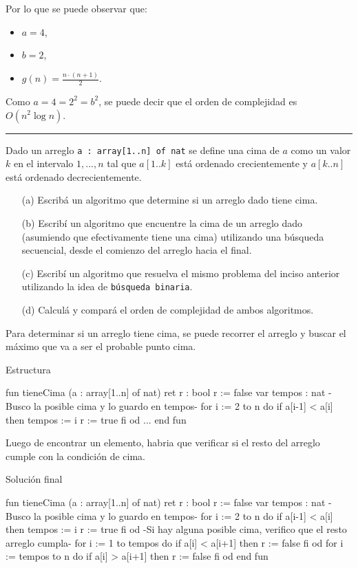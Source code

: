 Por lo que se puede observar que:
\begin{itemize}
    \item $a = 4$,
    \item $b = 2$,
    \item $g(n) = \frac{n\cdot (n+1)}{2}$.
\end{itemize}
Como $a = 4 = 2^2 = b^2$, se puede decir que el orden de complejidad es $O(n^2 \log n)$.

\begin{center}
    \rule{\textwidth}{0.4pt}
\end{center}

Dado un arreglo \texttt{a : array[1..n] of nat} se define una cima de $a$ como un valor $k$ en el intervalo $1, . . . ,n$ tal que $a[1..k]$ está ordenado crecientemente y $a[k..n]$ está ordenado decrecientemente.
\begin{itemize}
    \item[(a)] Escribá un algoritmo que determine si un arreglo dado tiene cima.
    \item[(b)] Escribí un algoritmo que encuentre la cima de un arreglo dado (asumiendo que efectivamente tiene una cima) utilizando una búsqueda secuencial, desde el comienzo del arreglo hacia el final. 
    \item[(c)] Escribí un algoritmo que resuelva el mismo problema del inciso anterior utilizando la idea de \texttt{búsqueda binaria}.
    \item[(d)] Calculá y compará el orden de complejidad de ambos algoritmos.
\end{itemize}

Para determinar si un arreglo tiene cima, se puede recorrer el arreglo y buscar el máximo que va a ser el probable punto cima.

\begin{codebox}{Estructura}
\begin{pascallike}
fun tieneCima (a : array[1..n] of nat) ret r : bool
    r := false
    var tempos : nat
    {-Busco la posible cima y lo guardo en tempos-}
    for i := 2 to n do
        if a[i-1] < a[i] then
            tempos := i
            r := true
        fi
    od
    ...
end fun
\end{pascallike}
\end{codebox}

Luego de encontrar un elemento, habria que verificar si el resto del arreglo cumple con la condición de cima.

\begin{codebox}{Solución final}
\begin{pascallike}
fun tieneCima (a : array[1..n] of nat) ret r : bool
    r := false
    var tempos : nat
    {-Busco la posible cima y lo guardo en tempos-}
    for i := 2 to n do
        if a[i-1] < a[i] then
            tempos := i
            r := true
        fi
    od
    {-Si hay alguna posible cima, verifico que el resto arreglo cumpla-}
    for i := 1 to tempos do
        if a[i] < a[i+1] then
            r := false
        fi
    od
    for i := tempos to n do
        if a[i] > a[i+1] then
            r := false
        fi
    od
end fun
\end{pascallike}
\end{codebox}

